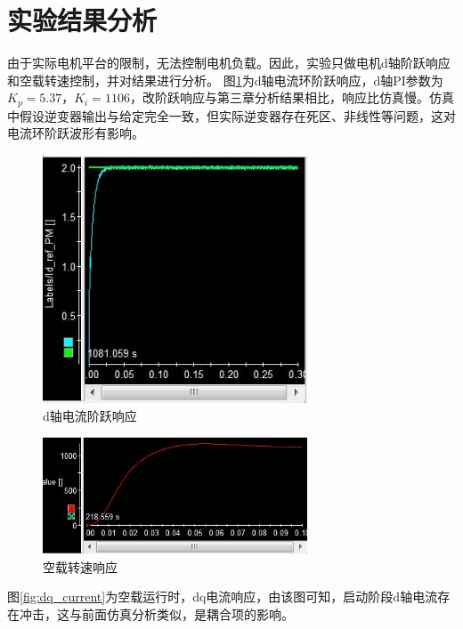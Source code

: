 \section{实验结果分析}
由于实际电机平台的限制，无法控制电机负载。因此，实验只做电机d轴阶跃响应和空载转速控制，并对结果进行分析。
图\ref{fig:d_axis_step}为d轴电流环阶跃响应，d轴PI参数为$K_{p}=5.37$，$K_{i}=1106$，改阶跃响应与第三章分析结果相比，响应比仿真慢。仿真中假设逆变器输出与给定完全一致，但实际逆变器存在死区、非线性等问题，这对电流环阶跃波形有影响。
\begin{figure}[H]
	\centering
	\includegraphics[width=0.7\textwidth]{figs/d_axis_current.jpg}
	\caption{d轴电流阶跃响应}
	\label{fig:d_axis_step}
\end{figure}
\begin{figure}[H]
	\centering
	\includegraphics[width=0.7\textwidth]{figs/speed_response.jpg}
	\caption{空载转速响应}
\end{figure}
图\ref{fig:dq_current}为空载运行时，dq电流响应，由该图可知，启动阶段d轴电流存在冲击，这与前面仿真分析类似，是耦合项的影响。
